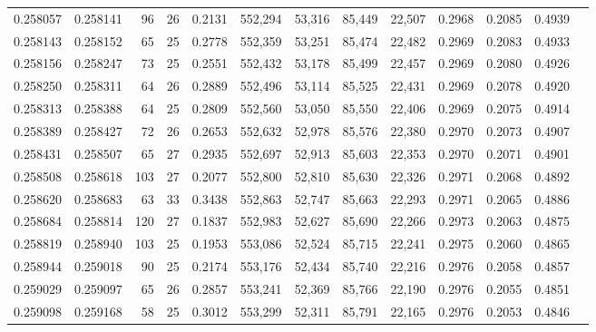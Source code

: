 \begin{tabular}{rrrrrrrrrrrrr}
0.258057 & 0.258141 &  96 &  26 &                                     0.2131 & 552,294 &  53,316 &  85,449 &  22,507 & 0.2968 & 0.2085 & 0.4939 \\
0.258143 & 0.258152 &  65 &  25 &                                     0.2778 & 552,359 &  53,251 &  85,474 &  22,482 & 0.2969 & 0.2083 & 0.4933 \\
0.258156 & 0.258247 &  73 &  25 &                                     0.2551 & 552,432 &  53,178 &  85,499 &  22,457 & 0.2969 & 0.2080 & 0.4926 \\
0.258250 & 0.258311 &  64 &  26 &                                     0.2889 & 552,496 &  53,114 &  85,525 &  22,431 & 0.2969 & 0.2078 & 0.4920 \\
0.258313 & 0.258388 &  64 &  25 &                                     0.2809 & 552,560 &  53,050 &  85,550 &  22,406 & 0.2969 & 0.2075 & 0.4914 \\
0.258389 & 0.258427 &  72 &  26 &                                     0.2653 & 552,632 &  52,978 &  85,576 &  22,380 & 0.2970 & 0.2073 & 0.4907 \\
0.258431 & 0.258507 &  65 &  27 &                                     0.2935 & 552,697 &  52,913 &  85,603 &  22,353 & 0.2970 & 0.2071 & 0.4901 \\
0.258508 & 0.258618 & 103 &  27 &                                     0.2077 & 552,800 &  52,810 &  85,630 &  22,326 & 0.2971 & 0.2068 & 0.4892 \\
0.258620 & 0.258683 &  63 &  33 &                                     0.3438 & 552,863 &  52,747 &  85,663 &  22,293 & 0.2971 & 0.2065 & 0.4886 \\
0.258684 & 0.258814 & 120 &  27 &                                     0.1837 & 552,983 &  52,627 &  85,690 &  22,266 & 0.2973 & 0.2063 & 0.4875 \\
0.258819 & 0.258940 & 103 &  25 &                                     0.1953 & 553,086 &  52,524 &  85,715 &  22,241 & 0.2975 & 0.2060 & 0.4865 \\
0.258944 & 0.259018 &  90 &  25 &                                     0.2174 & 553,176 &  52,434 &  85,740 &  22,216 & 0.2976 & 0.2058 & 0.4857 \\
0.259029 & 0.259097 &  65 &  26 &                                     0.2857 & 553,241 &  52,369 &  85,766 &  22,190 & 0.2976 & 0.2055 & 0.4851 \\
0.259098 & 0.259168 &  58 &  25 &                                     0.3012 & 553,299 &  52,311 &  85,791 &  22,165 & 0.2976 & 0.2053 & 0.4846 \\

\end{tabular}
